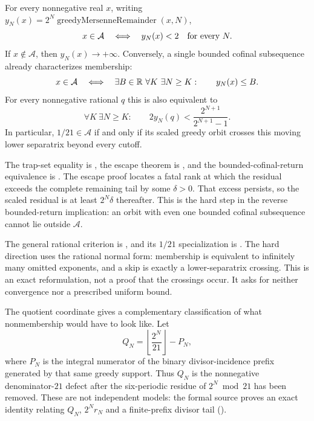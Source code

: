 \documentclass[11pt]{article}
\newcommand{\Ach}{\mathcal A}
\begin{document}
\begin{theorem}
\label{res:scaled-greedy-trap}
For every nonnegative real $x$, writing $y_N(x)=2^N
\operatorname{greedyMersenneRemainder}(x,N)$,
\[
 x\in\Ach\quad\Longleftrightarrow\quad
 y_N(x)<2\quad\hbox{for every }N.
\]
If $x\notin\Ach$, then $y_N(x)\to+\infty$.  Conversely, a single bounded
cofinal subsequence already characterizes membership:
\[
 x\in\Ach\quad\Longleftrightarrow\quad
 \exists B\in\R\ \forall K\ \exists N\ge K:\qquad y_N(x)\le B.
\]
For every nonnegative rational $q$ this is also equivalent to
\[
 \forall K\ \exists N\ge K:\qquad
 2y_N(q)<\frac{2^{N+1}}{2^{N+1}-1}.
\]
In particular, $1/21\in\Ach$ if and only if its scaled greedy orbit crosses
this moving lower separatrix beyond every cutoff.
\end{theorem}

\noindent The trap-set equality is
,
the escape theorem is
,
and the bounded-cofinal-return equivalence is
.
The escape proof locates a fatal rank at which the residual exceeds the
complete remaining tail by some $\delta>0$.  That excess persists, so the
scaled residual is at least $2^N\delta$ thereafter.  This is the hard step in
the reverse bounded-return implication: an orbit with even one bounded
cofinal subsequence cannot lie outside $\Ach$.

The general rational criterion is
,
and its $1/21$ specialization is
.
The hard direction uses the rational normal form: membership is equivalent to
infinitely many omitted exponents, and a skip is exactly a lower-separatrix
crossing.  This is an exact reformulation, not a proof that the crossings
occur.  It asks for neither convergence nor a prescribed uniform bound.

The quotient coordinate gives a complementary classification of what
nonmembership would have to look like.  Let
\[
 Q_N=\left\lfloor\frac{2^N}{21}\right\rfloor-P_N,
\]
where $P_N$ is the integral numerator of the binary divisor-incidence prefix
generated by that same greedy support.  Thus $Q_N$ is the nonnegative
denominator-$21$ defect after the six-periodic residue of $2^N\bmod21$ has
been removed.  These are not independent models: the formal source proves an
exact identity relating $Q_N$, $2^Nr_N$ and a finite-prefix divisor tail
().
\end{document}
